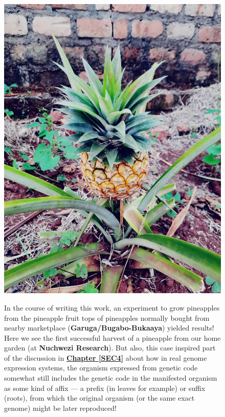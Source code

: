 \documentclass[a4paper, 18pt]{book} %
\begin{document}
\begin{figure}[H]
  \begin{center}
   \includegraphics[height=0.6\textheight,]{resources/images/the_pineapple.jpg}\\
   \caption{In the course of writing this work, an experiment to grow pineapples from the pineapple fruit tops of pineapples normally bought from nearby marketplace (\textbf{Garuga/Bugabo-Bukaaya}) yielded results! Here we see the first successful harvest of a pineapple from our home garden (at \textbf{Nuchwezi Research}). But also, this case inspired part of the discussion in \textbf{\hyperref[SEC4]{Chapter \ref{SEC4}}} about how in real genome expression systems, the organism expressed from genetic code somewhat still includes the genetic code in the manifested organism as some kind of affix --- a prefix (in leaves for example) or suffix (roots), from which the original organism (or the same exact genome) might be later reproduced!}
  \label{FIGPINEAPPLE}
  \end{center}
\end{figure}
\end{document}

